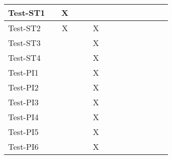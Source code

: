 \documentclass[12pt, titlepage]{article}
\begin{document}
\begin{table}[H]
\begin{adjustwidth}{-0.3in}{-0.5in}
{\begin{tabular}{c|c|c|c|c|c|c|c|c|c|c|c|c|c|}
\multicolumn{1}{|l|}{{Test-ST1}}   &             &       X      &             &             &             &             &                          &              &              &              &             &  &                    \\ \hline
\multicolumn{1}{|l|}{{Test-ST2}}   &             &         X    &             &             &     X        &             &             &             &              &              &              &             &                      \\ \hline
\multicolumn{1}{|l|}{{Test-ST3}}   &             &             &             &             &     X        &             &             &             &              &                            &             &  &                    \\ \hline
\multicolumn{1}{|l|}{{Test-ST4}}   &             &             &             &             &     X        &             &             &             &              &              &              &             &                      \\ \hline
\multicolumn{1}{|l|}{{Test-PI1}}   &             &             &             &             &     X        &             &                          &              &              &              &             &  &                    \\ \hline
\multicolumn{1}{|l|}{{Test-PI2}}   &             &             &             &             &     X        &             &             &             &              &              &              &             &                      \\ \hline
\multicolumn{1}{|l|}{{Test-PI3}}   &             &             &             &             &      X       &             &                          &              &              &              &             &  &                    \\ \hline
\multicolumn{1}{|l|}{{Test-PI4}}   &             &             &             &             &     X        &             &                          &              &              &              &             &  &                    \\ \hline
\multicolumn{1}{|l|}{{Test-PI5}}   &             &             &             &             &     X        &             &                          &              &              &              &             &  &                    \\ \hline
\multicolumn{1}{|l|}{{Test-PI6}}   &             &             &             &             &     X        &             &                          &              &              &              &             &  &                    \\ \hline

\end{tabular}}
\end{adjustwidth}
\end{table}
\end{document}
